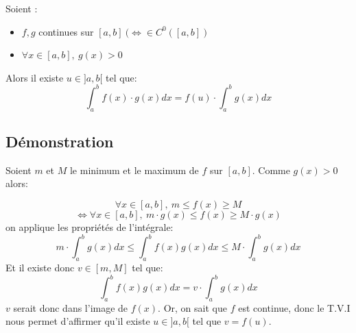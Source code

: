 \documentclass{article}
\begin{document}
Soient :
\begin{itemize}
    \item $ f, g $ continues sur $ [a, b]\ (\Leftrightarrow \in C^0([a, b]) $
    \item $ \forall x \in [a, b],\  g(x) > 0 $
\end{itemize}
Alors il existe $ u \in ]a, b[ $ tel que:
\[ \int_{a}^b f(x)\cdot g(x)dx = f(u) \cdot \int_{a}^b g(x)dx \]

\newpage

\subsection{Démonstration}

Soient $ m $ et $ M $ le minimum et le maximum de $ f $ sur $ [a, b] $. Comme $ g(x) > 0 $ alors:

\[ \forall x \in [a, b],\ m \leq f(x) \geq M \]
\[ \Leftrightarrow \forall x \in [a, b],\ m \cdot g(x) \leq f(x) \geq M \cdot g(x) \]
on applique les propriétés de l'intégrale:
\[ m \cdot \int_{a}^b g(x)dx \leq \int_{a}^b f(x)g(x)dx \leq M \cdot \int_{a}^b g(x)dx \]
Et il existe donc $ v \in [m, M] $ tel que:
\[ \int_{a}^b f(x)g(x)dx = v \cdot \int_{a}^b g(x)dx \]
$ v $ serait donc dans l'image de $ f(x) $. Or, on sait que $ f $ est continue, donc le T.V.I nous permet d'affirmer qu'il existe $ u \in ]a, b[ $ tel que $ v = f(u) $.
\end{document}
